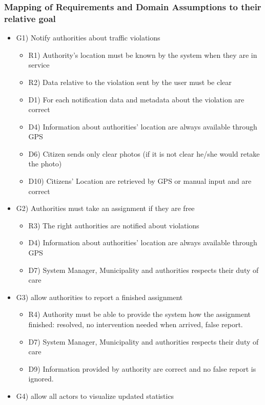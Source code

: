 \subsubsection{Mapping of Requirements and Domain Assumptions to their relative goal}
\begin{itemize}
\item G1) Notify authorities about traffic violations
\begin{itemize}
 \item R1) Authority’s location must be known by the system when they are in service
\item  R2) Data relative to the violation sent by the user must be clear
 \item D1) For each notification data and metadata about the violation are correct
 \item D4) Information about authorities’ location are always available through  GPS 
 \item D6) Citizen sends only clear photos (if it is not clear he/she would retake the photo)
 \item D10) Citizens’ Location are retrieved by  GPS or manual input and are correct
\end{itemize}
\item G2) Authorities must take an assignment if they are free
\begin{itemize}
 \item R3) The right authorities are notified about violations
 \item D4) Information about authorities’ location are always available through  GPS 
 \item D7) System Manager, Municipality and authorities respects their duty of care
\end{itemize}
\item G3) allow authorities to report a finished assignment
\begin{itemize}
 \item R4) Authority must be able to provide the system how the assignment finished: resolved, no intervention needed when arrived, false report.
 \item D7) System Manager, Municipality and authorities respects their duty of care
 \item D9) Information provided by authority are correct and no false report is ignored.
\end{itemize}
\item G4) allow all actors to visualize updated statistics
\begin{itemize}

\end{itemize}
\end{itemize}
